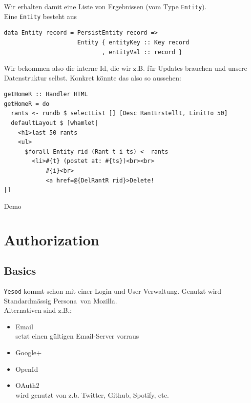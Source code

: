 \documentclass{beamer}
\begin{document}
\begin{frame}[fragile]
Wir erhalten damit eine Liste von Ergebnissen (vom Type \texttt{Entity}).\\\pause
Eine \texttt{Entity} besteht aus
\begin{verbatim}
data Entity record = PersistEntity record =>
                     Entity { entityKey :: Key record
                            , entityVal :: record }
\end{verbatim}
\pause
Wir bekommen also die interne Id, die wir z.B. für Updates brauchen und unsere Datenstruktur selbst. Konkret könnte das also so aussehen:
\begin{verbatim}
getHomeR :: Handler HTML
getHomeR = do
  rants <- rundb $ selectList [] [Desc RantErstellt, LimitTo 50]
  defaultLayout $ [whamlet|
    <h1>last 50 rants
    <ul>
      $forall Entity rid (Rant t i ts) <- rants
        <li>#{t} (postet at: #{ts})<br><br>
            #{i}<br>
            <a href=@{DelRantR rid}>Delete!
|]
\end{verbatim}
\end{frame}

\begin{frame}
Demo
\end{frame}

\section{Authorization}

\subsection{Basics}

\begin{frame}[fragile]
\texttt{Yesod} kommt schon mit einer Login und User-Verwaltung. Genutzt wird Standardmässig \glqq Persona\grqq \ von Mozilla.\\\pause
Alternativen sind z.B.:
\begin{itemize}
 \item Email\\
       setzt einen gültigen Email-Server vorraus
 \pause
 \item Google+
 \pause
 \item OpenId
 \pause
 \item OAuth2\\
       wird genutzt von z.b. Twitter, Github, Spotify, etc.
\end{itemize}
\end{frame}
\end{document}
